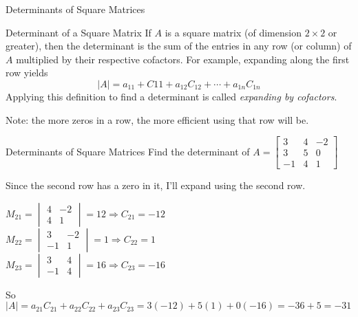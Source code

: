 \documentclass[t]{beamer}
\newcommand{\av}[1]{\left|{#1}\right|} %
\def\then{\Rightarrow}
\begin{document}
	\begin{frame}{Determinants of Square Matrices}
		\begin{block}{Determinant of a Square Matrix}
			If $A$ is a square matrix (of dimension $2 \times 2$ or greater), then the determinant is the sum of the entries in any row (or column) of $A$ multiplied by their respective cofactors. For example, expanding along the first row yields $$\av{A} = a_{11} + C{11} + a_{12}C_{12} + \cdots + a_{1n}C_{1n}$$ Applying this definition to find a determinant is called \textit{expanding by cofactors}.
		\end{block} \pause
	
		Note: the more zeros in a row, the more efficient using that row will be.
		
	\end{frame}

	\begin{frame}{Determinants of Square Matrices}
		Find the determinant of $A = \begin{bmatrix}
		3 & 4 & -2 \\ 3 & 5 & 0 \\ -1 & 4 & 1
		\end{bmatrix}$ \pause
		
		Since the second row has a zero in it, I'll expand using the second row.
		
		$M_{21} = \begin{vmatrix}
		4 & -2 \\ 4 & 1
		\end{vmatrix} = 12 \then C_{21} = -12$ \\ \pause
		$M_{22} = \begin{vmatrix}
		3 & -2 \\ -1 & 1
		\end{vmatrix} = 1 \then C_{22} = 1$ \\ \pause
		$M_{23} = \begin{vmatrix}
		3 & 4 \\ -1 & 4
		\end{vmatrix} = 16 \then C_{23} = -16$ \pause
		
		So $\av{A} = a_{21}C_{21} + a_{22}C_{22} + a_{23}C_{23} = 3(-12) + 5(1) + 0(-16) = -36 + 5 = -31$
	\end{frame}
\end{document}
